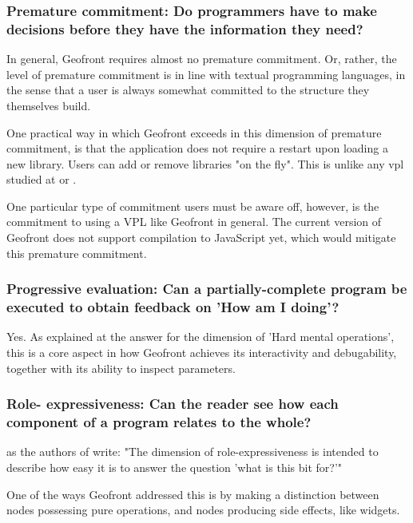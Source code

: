 \subsubsection*{Premature commitment: Do programmers have to make decisions before they have the information they need?}

In general, Geofront requires almost no premature commitment. 
Or, rather, the level of premature commitment is in line with textual programming languages, in the sense that a user is always somewhat committed to the structure they themselves build. 

One practical way in which Geofront exceeds in this dimension of premature commitment, is that the application does not require a restart upon loading a new library. 
Users can add or remove libraries "on the fly". 
This is unlike any vpl studied at  or .

One particular type of commitment users must be aware off, however, is the commitment to using a \ac{VPL} like Geofront in general.
The current version of Geofront does not support compilation to JavaScript yet, which would mitigate this premature commitment. 


\subsubsection*{Progressive evaluation: Can a partially-complete program be executed to obtain feedback on 'How am I doing'?}

Yes. 
As explained at the answer for the dimension of 'Hard mental operations', this is a core aspect in how Geofront achieves its interactivity and debugability, together with its ability to inspect parameters. 


\subsubsection*{Role- expressiveness: Can the reader see how each component of a program relates to the whole?}

as the authors of \cite[]{green_usability_1996} write: "The dimension of role-expressiveness is intended to describe how easy it is to answer the question 'what is this bit for?'"

One of the ways Geofront addressed this is by making a distinction between nodes possessing pure operations, and nodes producing side effects, like widgets. 

